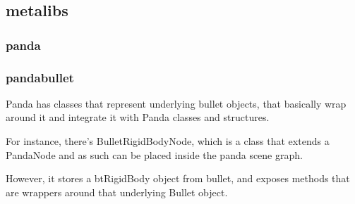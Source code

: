 \documentclass[a4paper]{article}
\begin{document}
\subsection[metalibs]{metalibs}
\hypertarget{RefHeading20631167907073}{}\clearpage\subsubsection[panda]{panda}
\hypertarget{RefHeading20651167907073}{}\subsubsection{}
\clearpage\subsubsection[pandabullet]{pandabullet}
\hypertarget{RefHeading20671167907073}{}{\color{black}
Panda has classes that represent underlying bullet objects, that basically wrap around it and integrate it with Panda
classes and structures.}

{\color{black}
For instance, there's BulletRigidBodyNode, which is a class that extends a PandaNode and as such can be placed inside
the panda scene graph. }

{\color{black}
However, it stores a btRigidBody object from bullet, and exposes methods that are wrappers around that underlying Bullet
object.}
\end{document}
